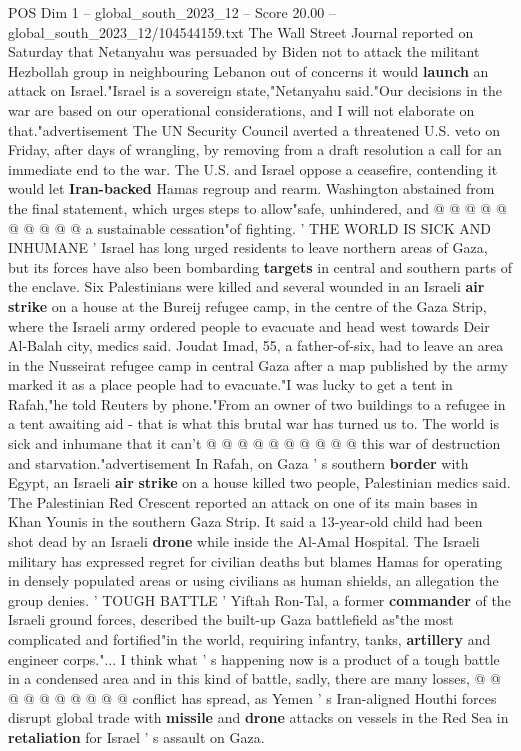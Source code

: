 \begin{textsample}{POS Dim 1 – global\_south\_2023\_12 – Score 20.00 – global\_south\_2023\_12/104544159.txt}
The Wall Street Journal reported on Saturday that Netanyahu was persuaded by Biden not to attack the militant Hezbollah group in neighbouring Lebanon out of concerns it would \textbf{launch} an attack on Israel."Israel is a sovereign state,"Netanyahu said."Our decisions in the war are based on our operational considerations, and I will not elaborate on that."advertisement The UN Security Council averted a threatened U.S. veto on Friday, after days of wrangling, by removing from a draft resolution a call for an immediate end to the war.
The U.S. and Israel oppose a ceasefire, contending it would let \textbf{Iran-backed} Hamas regroup and rearm.
Washington abstained from the final statement, which urges steps to allow"safe, unhindered, and @ @ @ @ @ @ @ @ @ @ a sustainable cessation"of fighting. ' THE WORLD IS SICK AND INHUMANE ' Israel has long urged residents to leave northern areas of Gaza, but its forces have also been bombarding \textbf{targets} in central and southern parts of the enclave.
Six Palestinians were killed and several wounded in an Israeli \textbf{air} \textbf{strike} on a house at the Bureij refugee camp, in the centre of the Gaza Strip, where the Israeli army ordered people to evacuate and head west towards Deir Al-Balah city, medics said.
Joudat Imad, 55, a father-of-six, had to leave an area in the Nusseirat refugee camp in central Gaza after a map published by the army marked it as a place people had to evacuate."I was lucky to get a tent in Rafah,"he told Reuters by phone."From an owner of two buildings to a refugee in a tent awaiting aid - that is what this brutal war has turned us to.
The world is sick and inhumane that it can't @ @ @ @ @ @ @ @ @ @ this war of destruction and starvation."advertisement In Rafah, on Gaza ' s southern \textbf{border} with Egypt, an Israeli \textbf{air} \textbf{strike} on a house killed two people, Palestinian medics said.
The Palestinian Red Crescent reported an attack on one of its main bases in Khan Younis in the southern Gaza Strip.
It said a 13-year-old child had been shot dead by an Israeli \textbf{drone} while inside the Al-Amal Hospital.
The Israeli military has expressed regret for civilian deaths but blames Hamas for operating in densely populated areas or using civilians as human shields, an allegation the group denies. ' TOUGH BATTLE ' Yiftah Ron-Tal, a former \textbf{commander} of the Israeli ground forces, described the built-up Gaza battlefield as"the most complicated and fortified"in the world, requiring infantry, tanks, \textbf{artillery} and engineer corps."...
I think what ' s happening now is a product of a tough battle in a condensed area and in this kind of battle, sadly, there are many losses, @ @ @ @ @ @ @ @ @ @ conflict has spread, as Yemen ' s Iran-aligned Houthi forces disrupt global trade with \textbf{missile} and \textbf{drone} attacks on vessels in the Red Sea in \textbf{retaliation} for Israel ' s assault on Gaza.

\end{textsample}
